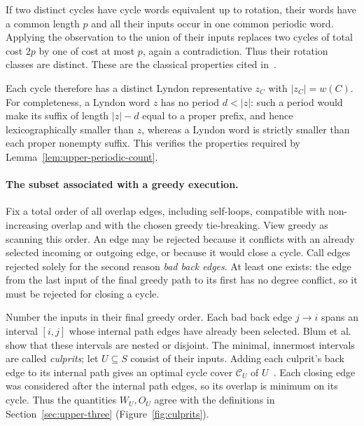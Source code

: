 \documentclass[11pt,a4paper]{article}   %
\theoremstyle{compact}
\theoremstyle{compactdef}
\begin{document}
If two distinct cycles have cycle words equivalent up to rotation, their
words have a common length $p$ and all their inputs occur in one common
periodic word. Applying the observation to the union of their inputs
replaces two cycles of total cost $2p$ by one of cost at most $p$, again
a contradiction. Thus their rotation classes are distinct. These are
the classical properties cited in~\cite[Lemma~2.5]{Muc13}.

Each cycle therefore has a distinct Lyndon representative $z_C$ with
$|z_C|=w(C)$. For completeness, a Lyndon word $z$ has no period
$d<|z|$: such a period would make its suffix of length $|z|-d$ equal to
a proper prefix, and hence lexicographically smaller than $z$, whereas
a Lyndon word is strictly smaller than each proper nonempty suffix.
This verifies the properties required by
Lemma~\ref{lem:upper-periodic-count}.

\paragraph{The subset associated with a greedy execution.}
Fix a total order of all overlap edges, including self-loops, compatible
with non-increasing overlap and with the chosen greedy tie-breaking.
View greedy as scanning this order. An edge may be rejected because
it conflicts with an already selected incoming or outgoing edge, or
because it would close a cycle. Call edges rejected solely for the
second reason \emph{bad back edges}.
At least one exists: the edge from the last input of the final greedy
path to its first has no degree conflict, so it must be rejected for
closing a cycle.

Number the inputs in their final greedy order. Each bad back edge
$j\to i$ spans an interval $[i,j]$ whose internal path edges have
already been selected. Blum et al.~\cite[Lemma~13]{BJLTY94} show that
these intervals are nested or disjoint. The minimal, innermost intervals
are called \emph{culprits}; let $U\subseteq S$ consist of their inputs.
Adding each culprit's back edge to its internal path gives an optimal
cycle cover $\mathcal C_U$ of $U$~\cite[Lemma~15]{BJLTY94}.
Each closing edge was considered after the internal path edges, so its
overlap is minimum on its cycle. Thus the quantities $W_U,O_U$ agree
with the definitions in Section~\ref{sec:upper-three}
(Figure~\ref{fig:culprits}).
\end{document}

